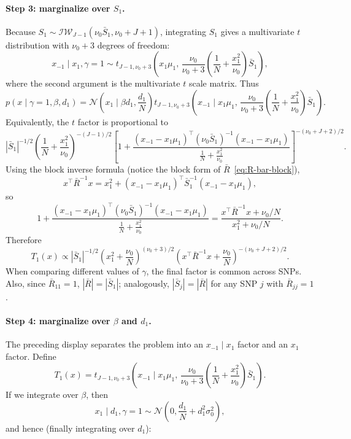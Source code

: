 \documentclass[11pt]{article}
\newcommand{\Normal}{\mathcal N}
\begin{document}
\paragraph{Step 3: marginalize over $S_1$.}
Because $S_1\sim \mathcal{IW}_{J-1}(\nu_0\bar S_1,\nu_0+J+1)$, integrating
$S_1$ gives a multivariate $t$ distribution with $\nu_0+3$ degrees of freedom:
\[
x_{-1}\mid x_1,\gamma=1
\sim
t_{J-1,\nu_0+3}\left(
x_1\mu_1,\,
\frac{\nu_0}{\nu_0+3}\left(\frac{1}{N}+\frac{x_1^2}{\nu_0}\right)\bar S_1
\right),
\]
where the second argument is the multivariate $t$ scale matrix. Thus
\[
p(x\mid \gamma=1,\beta,d_1)
=
\Normal\left(x_1\mid \beta d_1,\frac{d_1}{N}\right)
t_{J-1,\nu_0+3}\left(
x_{-1}\mid x_1\mu_1,\,
\frac{\nu_0}{\nu_0+3}\left(\frac{1}{N}+\frac{x_1^2}{\nu_0}\right)\bar S_1
\right).
\]
Equivalently, the $t$ factor is proportional to
\[
|\bar S_1|^{-1/2}
\left(\frac{1}{N}+\frac{x_1^2}{\nu_0}\right)^{-(J-1)/2}
\left[
1+
\frac{
(x_{-1}-x_1\mu_1)^\top(\nu_0\bar S_1)^{-1}
(x_{-1}-x_1\mu_1)
}{\frac{1}{N}+\frac{x_1^2}{\nu_0}}
\right]^{-(\nu_0+J+2)/2}.
\]
Using the block inverse formula (notice the block form of $\bar R$~\eqref{eq:R-bar-block}),
\[
x^\top\bar R^{-1}x
=
x_1^2+
(x_{-1}-x_1\mu_1)^\top\bar S_1^{-1}
(x_{-1}-x_1\mu_1),
\]
so
\[
1+
\frac{
(x_{-1}-x_1\mu_1)^\top(\nu_0\bar S_1)^{-1}
(x_{-1}-x_1\mu_1)
}{\frac{1}{N}+\frac{x_1^2}{\nu_0}}
=
\frac{x^\top\bar R^{-1}x+\nu_0/N}{x_1^2+\nu_0/N}.
\]
Therefore
\begin{equation}\label{eq:T_1}
T_1(x)
\propto
|\bar S_1|^{-1/2}
\left(x_1^2+\frac{\nu_0}{N}\right)^{(\nu_0+3)/2}
\left(x^\top\bar R^{-1}x+\frac{\nu_0}{N}\right)^{-(\nu_0+J+2)/2}.
\end{equation}
When comparing different values of $\gamma$, the final factor is common across
SNPs. Also, since $\bar R_{11}=1$, $|\bar R|=|\bar S_1|$; analogously,
$|\bar S_j|=|\bar R|$ for any SNP $j$ with $\bar R_{jj}=1$.



\paragraph{Step 4: marginalize over $\beta$ and $d_1$.}
The preceding display separates the problem into an $x_{-1}\mid x_1$ factor
and an $x_1$ factor. Define
\[
T_1(x)=
t_{J-1,\nu_0+3}\left(
x_{-1}\mid x_1\mu_1,\,
\frac{\nu_0}{\nu_0+3}\left(\frac{1}{N}+\frac{x_1^2}{\nu_0}\right)\bar S_1
\right).
\]
If we integrate over $\beta$, then
\[
x_1\mid d_1,\gamma=1
\sim
\Normal\left(0,\frac{d_1}{N}+d_1^2\sigma_0^2\right),
\]
and hence (finally integrating over $d_1$):
\end{document}

